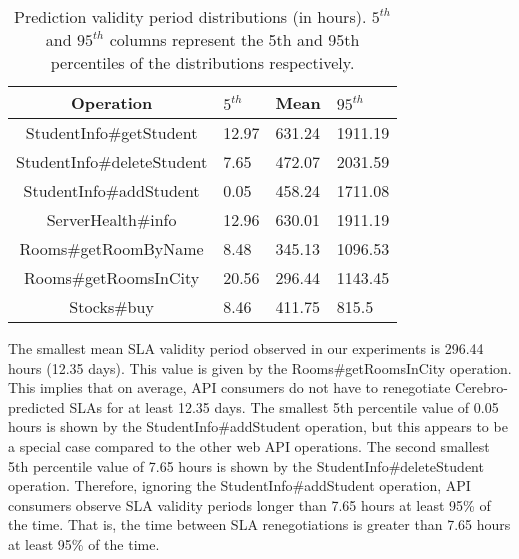 \begin{table}
\begin{center}
\begin{tabular}{|c|p{1cm}|p{1cm}|p{1cm}|}
\hline
Operation & $5^{th}$ & Mean & $95^{th}$ \\ \hline
StudentInfo\#getStudent & 12.97 & 631.24 & 1911.19 \\ \hline
StudentInfo\#deleteStudent & 7.65 & 472.07 & 2031.59 \\ \hline
StudentInfo\#addStudent & 0.05 & 458.24 & 1711.08 \\ \hline
ServerHealth\#info & 12.96 & 630.01 & 1911.19 \\ \hline
Rooms\#getRoomByName & 8.48 & 345.13 & 1096.53 \\ \hline
Rooms\#getRoomsInCity & 20.56 & 296.44 & 1143.45 \\ \hline
Stocks\#buy & 8.46 & 411.75 & 815.5 \\ \hline
\end{tabular}
\end{center}
\caption{Prediction validity period distributions (in hours).
$5^{th}$ and $95^{th}$ 
columns represent the 5th and 95th percentiles of the
distributions respectively.
\label{tab:validity_periods}
}
\vspace{-0.3in}
\end{table}

The smallest
mean SLA validity period observed in our experiments is 296.44 hours (12.35 days). This value is given by the
Rooms\#getRoomsInCity operation. 
This implies that on average, API consumers do not have to renegotiate Cerebro-predicted SLAs
for at least 12.35 days.
The smallest 5th percentile value of 0.05 hours is shown by
the StudentInfo\#addStudent operation, but this appears to be a special case compared to the other web API
operations. The second smallest 5th percentile value of 7.65 hours is shown by the 
StudentInfo\#deleteStudent operation. Therefore, ignoring the StudentInfo\#addStudent operation, API
consumers observe SLA validity periods longer than 7.65 hours at least 95\% of the time. That is, the time
between SLA renegotiations is greater than 7.65 hours at least 95\% of the time.

